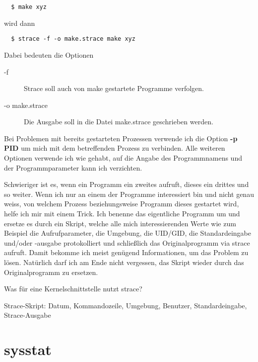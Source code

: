 \begin{normaltext}
  \begin{verbatim}
  $ make xyz
  \end{verbatim}

  wird dann

  \begin{verbatim}
  $ strace -f -o make.strace make xyz
  \end{verbatim}

  Dabei bedeuten die Optionen

  \begin{description}
    \item[-f] Strace soll auch von make gestartete Programme verfolgen.
    \item[-o make.strace] Die Ausgabe soll in die Datei make.strace
      geschrieben werden.
  \end{description}

  Bei Problemen mit bereits gestarteten Prozessen verwende ich die Option
  {\bf -p PID} um mich mit dem betreffenden Prozess zu verbinden. Alle
  weiteren Optionen verwende ich wie gehabt, auf die Angabe des Programmnamens
  und der Programmparameter kann ich verzichten.

  Schwieriger ist es, wenn ein Programm ein zweites aufruft, dieses ein
  drittes und so weiter. Wenn ich nur an einem der Programme interessiert bin
  und nicht genau weiss, von welchem Prozess beziehungsweise Programm dieses
  gestartet wird, helfe ich mir mit einem Trick. Ich benenne das eigentliche
  Programm um und ersetze es durch ein Skript, welche alle mich
  interessierenden Werte wie zum Beispiel die Aufrufparameter, die Umgebung,
  die UID/GID, die Standardeingabe und/oder -ausgabe protokolliert und
  schließlich das Originalprogramm via strace aufruft.
  Damit bekomme ich meist genügend Informationen, um das Problem zu lösen.
  Natürlich darf ich am Ende nicht vergessen, das Skript wieder durch das
  Originalprogramm zu ersetzen.

  \begin{notes}
  \item Was für eine Kernelschnittstelle nutzt strace?
  \item Strace-Skript: Datum, Kommandozeile, Umgebung, Benutzer,
    Standardeingabe, Strace-Ausgabe
  \end{notes}

\end{normaltext}
\section{sysstat}
\label{sec:lokal-werkzeuge-sysstat}

